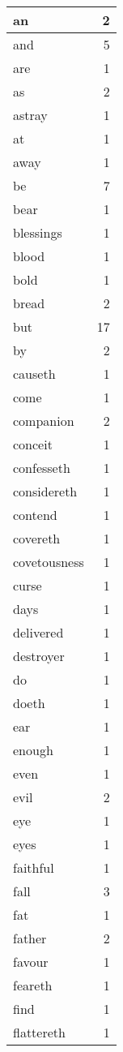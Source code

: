 \begin{center}
\begin{longtable}{l|r}
an & 2\\ \hline 
and & 5\\ \hline 
are & 1\\ \hline 
as & 2\\ \hline 
astray & 1\\ \hline 
at & 1\\ \hline 
away & 1\\ \hline 
be & 7\\ \hline 
bear & 1\\ \hline 
blessings & 1\\ \hline 
blood & 1\\ \hline 
bold & 1\\ \hline 
bread & 2\\ \hline 
but & 17\\ \hline 
by & 2\\ \hline 
causeth & 1\\ \hline 
come & 1\\ \hline 
companion & 2\\ \hline 
conceit & 1\\ \hline 
confesseth & 1\\ \hline 
considereth & 1\\ \hline 
contend & 1\\ \hline 
covereth & 1\\ \hline 
covetousness & 1\\ \hline 
curse & 1\\ \hline 
days & 1\\ \hline 
delivered & 1\\ \hline 
destroyer & 1\\ \hline 
do & 1\\ \hline 
doeth & 1\\ \hline 
ear & 1\\ \hline 
enough & 1\\ \hline 
even & 1\\ \hline 
evil & 2\\ \hline 
eye & 1\\ \hline 
eyes & 1\\ \hline 
faithful & 1\\ \hline 
fall & 3\\ \hline 
fat & 1\\ \hline 
father & 2\\ \hline 
favour & 1\\ \hline 
feareth & 1\\ \hline 
find & 1\\ \hline 
flattereth & 1\\ \hline 

\end{longtable}
\end{center}
